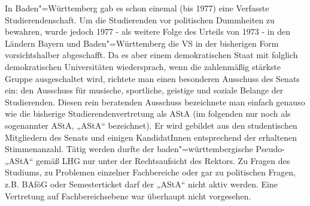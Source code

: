 In Baden"=Württemberg gab es schon einemal (bis 1977) eine Verfasste
Studierendenschaft. Um die Studierenden vor politischen Dummheiten zu bewahren,
wurde jedoch 1977 - als weitere Folge des Urteils von 1973 - in den Ländern
Bayern und Baden"=Württemberg die VS in der bisherigen Form vorsichtshalber
abgeschafft. Da es aber einem demokratischen Staat mit folglich demokratischen
Universitäten wiedersprach, wenn die zahlenmäßig stärkste Gruppe ausgeschaltet
wird, richtete man einen besonderen Ausschuss des Senats ein: den Ausschuss für
musische, sportliche, geistige und soziale Belange der Studierenden. Diesen
rein beratenden Ausschuss bezeichnete man einfach genauso wie die bisherige
Studierendenvertretung als AStA (im folgenden nur noch als sogenannter AStA,
„AStA“ bezeichnet). Er wird gebildet aus den studentischen Mitgliedern des
Senats und einigen KandidatInnen entsprechend der erhaltenen Stimmenanzahl.
Tätig werden durfte der baden"=württembergische Pseudo-„AStA“ gemäß LHG nur
unter der Rechtsaufsicht des Rektors. Zu Fragen des Studiums, zu Problemen
einzelner Fachbereiche oder gar zu politischen Fragen, z.B. BAföG oder
Semesterticket darf der „AStA“ nicht aktiv werden. Eine Vertretung auf
Fachbereichsebene war überhaupt nicht vorgesehen.


